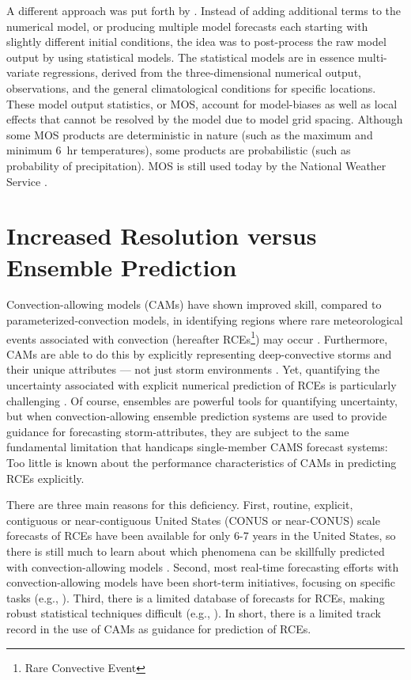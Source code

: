 A different approach was put forth by \cite{Glahn1972}.
Instead of adding additional terms to the numerical model, or producing multiple model forecasts each starting with slightly different initial conditions, the idea was to post-process the raw model output by using statistical models.
The statistical models are in essence multi-variate regressions, derived from the three-dimensional numerical output, observations, and the general climatological conditions for specific locations.
These model output statistics, or MOS, account for model-biases as well as local effects that cannot be resolved by the model due to model grid spacing.
Although some MOS products are deterministic in nature (such as the maximum and minimum \mbox{6 hr} temperatures), some products are probabilistic (such as probability of precipitation).
MOS is still used today by the National Weather Service \citep{Allen2001a, Allen2001b, Sfanos2001, Carroll2005, Glahn2009}.




\section{Increased Resolution versus Ensemble Prediction}

Convection-allowing models (CAMs) have shown improved skill, compared to parameterized-convection models, in identifying regions where rare meteorological events associated with convection (hereafter RCEs\footnote{Rare Convective Event}) may occur \citep{Clark2010a}.
Furthermore, CAMs are able to do this by explicitly representing deep-convective storms and their unique attributes --- not just storm environments \citep{Kain2010}.
Yet, quantifying the uncertainty associated with explicit numerical prediction of RCEs is particularly challenging \citep{Sobash2011}.
Of course, ensembles are powerful tools for quantifying uncertainty, but when convection-allowing ensemble prediction systems are used to provide guidance for forecasting storm-attributes, they are subject to the same fundamental limitation that handicaps single-member CAMS forecast systems: Too little is known about the performance characteristics of CAMs in predicting RCEs explicitly.


There are three main reasons for this deficiency.
First, routine, explicit, contiguous  or near-contiguous United States (CONUS or near-CONUS) scale forecasts of RCEs have been available for only 6-7 years in the United States, so there is still much to learn about which phenomena can be skillfully predicted with convection-allowing models \citep{Kain2008, Kain2010}.
Second, most real-time forecasting efforts with convection-allowing models have been short-term initiatives, focusing on specific tasks (e.g., \citealp{Done2004, Weisman2008}).
Third, there is a limited database of forecasts for RCEs, making robust statistical techniques difficult (e.g., \citealp{Hamill2006}).
In short, there is a limited track record in the use of CAMs as guidance for prediction of RCEs.


